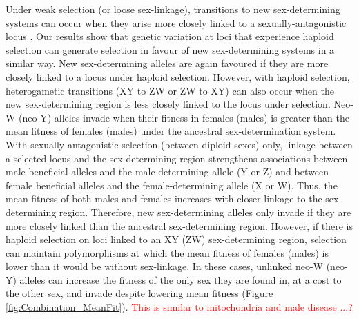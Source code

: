 \documentclass[12pt]{article}
\begin{document}
Under weak selection (or loose sex-linkage), transitions to new sex-determining systems can occur when they arise more closely linked to a sexually-antagonistic locus \citep{vanDoorn:2007eu,vanDoorn:2010hu}.
Our results show that genetic variation at loci that experience haploid selection can generate selection in favour of new sex-determining systems in a similar way. 
New sex-determining alleles are again favoured if they are more closely linked to a locus under haploid selection.
However, with haploid selection, heterogametic transitions (XY to ZW or ZW to XY) can also occur when the new sex-determining region is less closely linked to the locus under selection. 
Neo-W (neo-Y) alleles invade when their fitness in females (males) is greater than the mean fitness of females (males) under the ancestral sex-determination system.
With sexually-antagonistic selection (between diploid sexes) only, linkage between a selected locus and the sex-determining region strengthens associations between male beneficial alleles and the male-determining allele (Y or Z) and between female beneficial alleles and the female-determining allele (X or W). 
Thus, the mean fitness of both males and females increases with closer linkage to the sex-determining region. 
Therefore, new sex-determining alleles only invade if they are more closely linked than the ancestral sex-determining region. 
However, if there is haploid selection on loci linked to an XY (ZW) sex-determining region, selection can maintain polymorphisms at which the mean fitness of females (males) is lower than it would be without sex-linkage. 
In these cases, unlinked neo-W (neo-Y) alleles can increase the fitness of the only sex they are found in, at a cost to the other sex, and invade despite lowering mean fitness (Figure \ref{fig:Combination_MeanFit}). 
\textcolor{red}{This is similar to mitochondria and male disease ...?}

\end{document}
